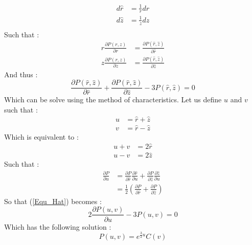 \documentclass[a4paper,12pt]{article}
\theoremstyle{definition}
\begin{document}
\begin{equation}
\begin{split}
	d\hat{r}&=\frac{1}{r}dr\\
	d\hat{z}&=\frac{1}{z}dz\\
\end{split}
\end{equation}
Such that :
\begin{equation}
\begin{split}
	r\frac{\partial P(r,z)}{\partial r}&=\frac{\partial P(\hat r,\hat z)}{\partial \hat{r}}\\
	z\frac{\partial P(r,z)}{\partial z}&=\frac{\partial P(\hat r,\hat z)}{\partial \hat{z}}
\end{split}
\end{equation}
And thus :
\begin{equation}\label{Equ_Hat}
	\frac{\partial P(\hat r,\hat z)}{\partial \hat{r}}+\frac{\partial P(\hat r,\hat z)}{\partial \hat{z}}-3P(\hat r,\hat z)=0
\end{equation}
Which can be solve using the method of characteristics.
Let us define $u$ and $v$ such that :
\begin{equation}
\begin{split}
	u&=\hat r + \hat z\\
	v&=\hat r - \hat z
\end{split}
\end{equation}
Which is equivalent to :
\begin{equation}
\begin{split}
	u+v&=2\hat r\\
	u-v&=2\hat z
\end{split}
\end{equation}
Such that :
\begin{equation}
\begin{split}
	\frac{\partial P}{\partial u}&=\frac{\partial P}{\partial \hat{r}}\frac{\partial \hat r}{\partial u}+\frac{\partial P}{\partial \hat{z}}\frac{\partial \hat z}{\partial u}\\
	&=\frac{1}{2}(\frac{\partial P}{\partial \hat{r}}+\frac{\partial P}{\partial \hat{z}})
\end{split}
\end{equation}
So that (\ref{Equ_Hat}) becomes :
\begin{equation}
	2\frac{\partial P(u,v)}{\partial u}-3P(u,v)=0
\end{equation}
Which has the following solution :
\begin{equation}
	P(u,v)=e^{\frac{3}{2}u}C(v)
\end{equation}
\end{document}
